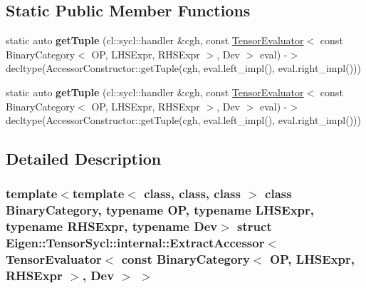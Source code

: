 \subsection*{Static Public Member Functions}
\begin{DoxyCompactItemize}
\item 
\mbox{\label{struct_eigen_1_1_tensor_sycl_1_1internal_1_1_extract_accessor_3_01_tensor_evaluator_3_01const_01b2d1164787704459976e801609bbec58_aa6fad6cfe9b2c23de6b047d0bd936a1a}} 
static auto {\bfseries get\+Tuple} (cl\+::sycl\+::handler \&cgh, const \hyperlink{struct_eigen_1_1_tensor_evaluator}{Tensor\+Evaluator}$<$ const Binary\+Category$<$ OP, L\+H\+S\+Expr, R\+H\+S\+Expr $>$, Dev $>$ eval) -\/$>$ decltype(Accessor\+Constructor\+::get\+Tuple(cgh, eval.\+left\+\_\+impl(), eval.\+right\+\_\+impl()))
\item 
\mbox{\label{struct_eigen_1_1_tensor_sycl_1_1internal_1_1_extract_accessor_3_01_tensor_evaluator_3_01const_01b2d1164787704459976e801609bbec58_aa6fad6cfe9b2c23de6b047d0bd936a1a}} 
static auto {\bfseries get\+Tuple} (cl\+::sycl\+::handler \&cgh, const \hyperlink{struct_eigen_1_1_tensor_evaluator}{Tensor\+Evaluator}$<$ const Binary\+Category$<$ OP, L\+H\+S\+Expr, R\+H\+S\+Expr $>$, Dev $>$ eval) -\/$>$ decltype(Accessor\+Constructor\+::get\+Tuple(cgh, eval.\+left\+\_\+impl(), eval.\+right\+\_\+impl()))
\end{DoxyCompactItemize}


\subsection{Detailed Description}
\subsubsection*{template$<$template$<$ class, class, class $>$ class Binary\+Category, typename OP, typename L\+H\+S\+Expr, typename R\+H\+S\+Expr, typename Dev$>$\newline
struct Eigen\+::\+Tensor\+Sycl\+::internal\+::\+Extract\+Accessor$<$ Tensor\+Evaluator$<$ const Binary\+Category$<$ O\+P, L\+H\+S\+Expr, R\+H\+S\+Expr $>$, Dev $>$ $>$}

